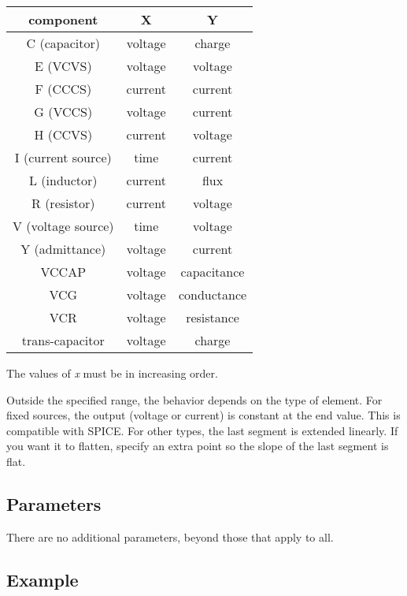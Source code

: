 \begin{tabular}{|c|c|c|}
\hline 
component	&X		&Y		\\\hline\hline 
C (capacitor)	&voltage	&charge 	\\\hline 
E (VCVS)	&voltage	&voltage	\\\hline
F (CCCS)	&current	&current	\\\hline 
G (VCCS)	&voltage	&current	\\\hline 
H (CCVS)	&current	&voltage	\\\hline 
I (current source) &time	&current	\\\hline
L (inductor)	&current	&flux		\\\hline
R (resistor)	&current	&voltage	\\\hline
V (voltage source) &time	&voltage	\\\hline
Y (admittance)	&voltage	&current	\\\hline
VCCAP		&voltage	&capacitance	\\\hline 
VCG		&voltage	&conductance	\\\hline 
VCR		&voltage	&resistance	\\\hline 
trans-capacitor	&voltage	&charge		\\\hline 
\end{tabular}

The values of {\it x} must be in increasing order.

Outside the specified range, the behavior depends on the type of
element.  For fixed sources, the output (voltage or current) is
constant at the end value.  This is compatible with SPICE.  For other
types, the last segment is extended linearly.  If you want it to
flatten, specify an extra point so the slope of the last segment is
flat.
\subsection{Parameters}

There are no additional parameters, beyond those that apply to all.
\subsection{Example} 


